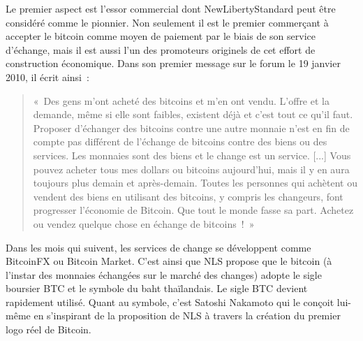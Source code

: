 
Le premier aspect est l'essor commercial dont NewLibertyStandard peut être considéré comme le pionnier. Non seulement il est le premier commerçant à accepter le bitcoin comme moyen de paiement par le biais de son service d'échange, mais il est aussi l'un des promoteurs originels de cet effort de construction économique. Dans son premier message sur le forum le 19 janvier 2010, il écrit ainsi~:

\begin{quote}
«~Des gens m'ont acheté des bitcoins et m'en ont vendu. L'offre et la demande, même si elle sont faibles, existent déjà et c'est tout ce qu'il faut. Proposer d'échanger des bitcoins contre une autre monnaie n'est en fin de compte pas différent de l'échange de bitcoins contre des biens ou des services. Les monnaies sont des biens et le change est un service. [...] Vous pouvez acheter tous mes dollars ou bitcoins aujourd'hui, mais il y en aura toujours plus demain et après-demain. Toutes les personnes qui achètent ou vendent des biens en utilisant des bitcoins, y compris les changeurs, font progresser l'économie de Bitcoin. Que tout le monde fasse sa part. Achetez ou vendez quelque chose en échange de bitcoins~!~»
\end{quote}


Dans les mois qui suivent, les services de change se développent comme BitcoinFX ou Bitcoin Market. C'est ainsi que NLS propose que le bitcoin (à l'instar des monnaies échangées sur le marché des changes) adopte le sigle boursier BTC et le symbole du baht thaïlandais. Le sigle BTC devient rapidement utilisé. Quant au symbole, c'est Satoshi Nakamoto qui le conçoit lui-même en s'inspirant de la proposition de NLS à travers la création du premier logo réel de Bitcoin.

